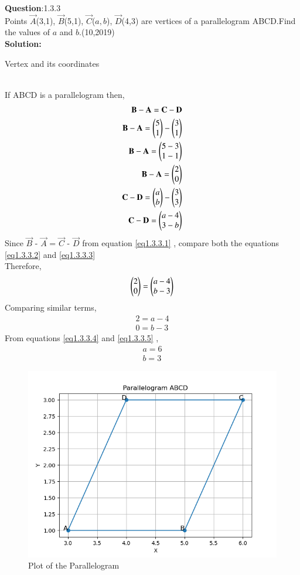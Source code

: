 \documentclass[journal]{IEEEtran}
\begin{document}
\textbf{Question}:1.3.3\\
Points $\vec{A}$(3,1), $\vec{B}$(5,1), $\vec{C}$($a,b$), $\vec{D}$(4,3) are vertices of a parallelogram ABCD.Find the values of $a$ and $b$.\hfill(10,2019)
\\
\textbf{Solution:}
\renewcommand{\tablename}{Table 1.3.3.1}
\begin{table}[h!]
  \centering
  
  \caption{Vertex and its coordinates}
\end{table}\\
 If ABCD is a parallelogram then,
 \begin{align}
     \mathbf{B} - \mathbf{A} = \mathbf{C} - \mathbf{D} \label{eq1.3.3.1} \\
     \mathbf{B} - \mathbf{A} = \begin{pmatrix}5 \\ 1\end{pmatrix} - \begin{pmatrix}3 \\ 1\end{pmatrix} \\
     \mathbf{B} - \mathbf{A} = \begin{pmatrix}5 - 3 \\ 1 - 1\end{pmatrix}\\
     \mathbf{B} - \mathbf{A} = \begin{pmatrix}2 \\ 0\end{pmatrix} \label{eq1.3.3.2} \\
     \mathbf{C} - \mathbf{D} = \begin{pmatrix}a \\ b\end{pmatrix} - \begin{pmatrix}3 \\ 3\end{pmatrix} \\
     \mathbf{C} - \mathbf{D} = \begin{pmatrix}a - 4 \\ 3 - b\end{pmatrix} \label{eq1.3.3.3} \\
     \end{align}
Since  $\vec{B}$ - $\vec{A}$ = $\vec{C}$ - $\vec{D}$ from equation              \ref{eq1.3.3.1} , compare both the equations \ref{eq1.3.3.2} and \ref{eq1.3.3.3} \\
Therefore,
\begin{align}
    \begin{pmatrix}2 \\ 0\end{pmatrix} = \begin{pmatrix}a - 4 \\ b - 3\end{pmatrix} \\
\end{align}
Comparing similar terms,
\begin{align}
    2 = a - 4 \label{eq1.3.3.4} \\
    0 = b - 3 \label{eq1.3.3.5}
\end{align}
From equations \ref{eq1.3.3.4} and \ref{eq1.3.3.5} , \\
\begin{align}
    a = 6 \\
    b = 3
    \end{align}
    \begin{figure}[h!]
	    \centering
	    \includegraphics[width=0.7\linewidth]{figs/pgm.png}
	    \caption{Plot of the Parallelogram}
    \end{figure}
    
\end{document}
